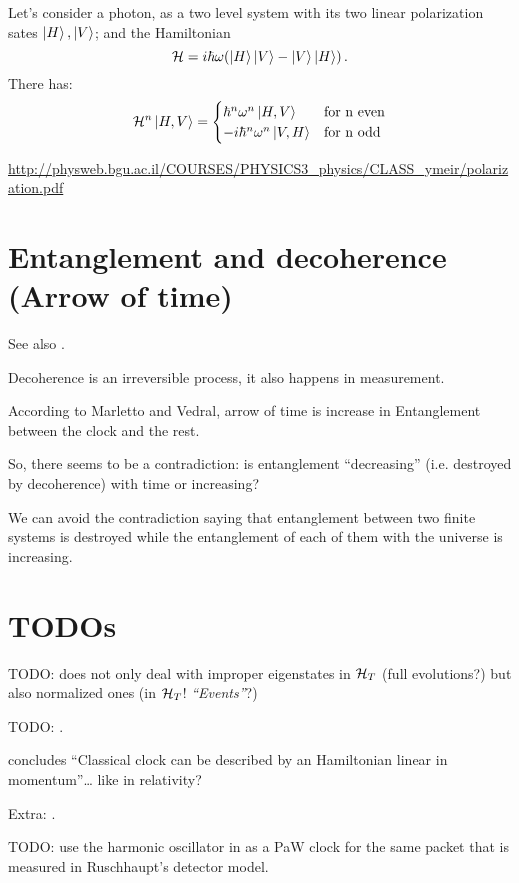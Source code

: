 Let's consider a photon, as a two level system with its two linear polarization
sates $\ket{H}, \ket{V}$;
and the Hamiltonian
\begin{equation}
  \mathcal{H}=i\hbar\omega\qty(\ket{H}\ket{V}-\ket{V}\ket{H})\,\text{.}
\end{equation}
There has:
\[
  \mathcal{H}^n \ket{H, V} = \begin{cases}
      \hbar^n\omega^n\ket{H, V} &\text{for n even} \\
    -i\hbar^n\omega^n\ket{V, H} &\text{for n odd}
  \end{cases}
\]

\url{http://physweb.bgu.ac.il/COURSES/PHYSICS3_physics/CLASS_ymeir/polarization.pdf}

\section{Entanglement and decoherence (Arrow of time)}
See also \cite{EntanglementVsDecoherence}.

Decoherence is an irreversible process, it also happens in measurement.

According to Marletto and Vedral, arrow of time is increase in Entanglement
between the clock and the rest.

So, there seems to be a contradiction: is entanglement ``decreasing''
(i.e. destroyed by decoherence) with time
or increasing?

We can avoid the contradiction saying that
entanglement between two finite systems is
destroyed while the entanglement of each of them with the universe
is increasing.




\section{TODOs}

TODO: \cite{Lloyd:Time} does not only deal with improper eigenstates in $\mathcal{H}_T$
(full evolutions?)
but also normalized ones (in $\mathcal{H}_T$! \emph{``Events''}?)

TODO: \cite{RealisticClocks}.

\cite{HarmonicClocks} concludes ``Classical clock can be described by an Hamiltonian linear in momentum''\dots
like in relativity?

Extra: \cite{TimeAnyons}.

TODO: use the harmonic oscillator in \cite{HarmonicClocks}
as a PaW clock for the same packet that is measured in
Ruschhaupt's detector model.

